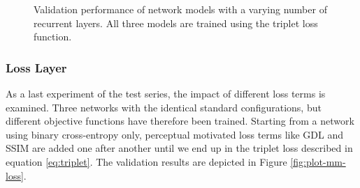\begin{figure}[htb]
\begin{subfigure}{0.5\textwidth}
{
  }
  \caption{}
  \label{fig:plot-mm-layer-psnr}
\end{subfigure}
\caption[Influences of ConvLSTM Layers]{Validation performance of network models with a varying number of recurrent layers. All three models are trained using the triplet loss function.} \label{fig:plot-mm-layer}
\end{figure}



\subsubsection*{Loss Layer}

As a last experiment of the test series, the impact of different loss terms is examined. Three networks with the identical standard configurations, but different objective functions have therefore been trained. Starting from a network using binary cross-entropy only, perceptual motivated loss terms like GDL and SSIM are added one after another until we end up in the triplet loss described in equation \ref{eq:triplet}. The validation results are depicted in Figure \ref{fig:plot-mm-loss}.

